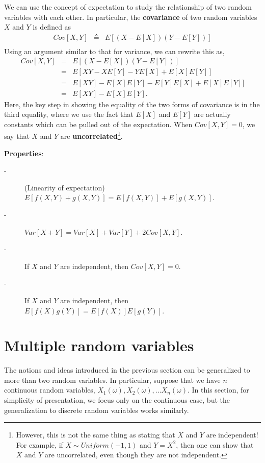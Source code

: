 \documentclass{article}
\begin{document}
We can use the concept of expectation to study the relationship of two random variables with each other.  In particular, the \textbf{covariance} of two random variables $X$ and $Y$ is defined as
\begin{eqnarray*}
Cov[X,Y] 
&\triangleq& E[(X-E[X])(Y-E[Y])] \\
\end{eqnarray*}
Using an argument similar to that for variance, we can rewrite this as,
\begin{eqnarray*}
Cov[X,Y] 
&=& E[(X-E[X])(Y-E[Y])] \\
&=& E[XY - X E[Y] - Y E[X] + E[X] E[Y]] \\
&=& E[XY] - E[X] E[Y] - E[Y] E[X] + E[X] E[Y]] \\
&=& E[XY] - E[X] E[Y].
\end{eqnarray*}
Here, the key step in showing the equality of the two forms of covariance is in the third equality, where we use the fact that $E[X]$ and $E[Y]$ are actually constants which
can be pulled out of the expectation.  When $Cov[X,Y] = 0$, we say that $X$ and $Y$ are \textbf{uncorrelated}\footnote{
  However, this is not the same thing as stating that $X$ and $Y$ are independent!  For example, if $X \sim Uniform(-1,1)$ and $Y = X^2$, then one can show that $X$ and $Y$ are
  uncorrelated, even though they are not independent.
}.

\textbf{Properties}:
\begin{description}
\item[-] (Linearity of expectation) $E[f(X,Y) + g(X,Y)] = E[f(X,Y)] + E[g(X,Y)]$.
\item[-] $Var[X + Y] = Var[X] + Var[Y] + 2 Cov[X, Y]$.
\item[-] If $X$ and $Y$ are independent, then $Cov[X, Y] = 0$.
\item[-] If $X$ and $Y$ are independent, then $E[f(X)g(Y)] = E[f(X)] E[g(Y)]$.
\end{description}

\section{Multiple random variables}

The notions and ideas introduced in the previous section can be
generalized to more than two random variables.  In particular, suppose that we have $n$ continuous
random variables, $X_1(\omega),X_2(\omega), \ldots X_n(\omega)$.  In this section, for simplicity of presentation,
we focus only on the continuous case, but the generalization to discrete random variables works similarly.
\end{document}
